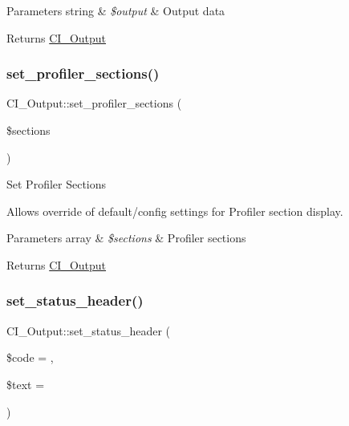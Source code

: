 \begin{DoxyParams}[1]{Parameters}
string & {\em \$output} & Output data \\
\hline
\end{DoxyParams}
\begin{DoxyReturn}{Returns}
\mbox{\hyperlink{class_c_i___output}{C\+I\+\_\+\+Output}} 
\end{DoxyReturn}
\mbox{\label{class_c_i___output_a5eec9b34053c10c787e340e74d66fc98}} 
\subsubsection{\texorpdfstring{set\+\_\+profiler\+\_\+sections()}{set\_profiler\_sections()}}
{\footnotesize\ttfamily C\+I\+\_\+\+Output\+::set\+\_\+profiler\+\_\+sections (\begin{DoxyParamCaption}\item[{}]{\$sections }\end{DoxyParamCaption})}

Set Profiler Sections

Allows override of default/config settings for Profiler section display.


\begin{DoxyParams}[1]{Parameters}
array & {\em \$sections} & Profiler sections \\
\hline
\end{DoxyParams}
\begin{DoxyReturn}{Returns}
\mbox{\hyperlink{class_c_i___output}{C\+I\+\_\+\+Output}} 
\end{DoxyReturn}
\mbox{\label{class_c_i___output_a1a4cee03a9a0d191e26e5e8898662d69}} 
\subsubsection{\texorpdfstring{set\+\_\+status\+\_\+header()}{set\_status\_header()}}
{\footnotesize\ttfamily C\+I\+\_\+\+Output\+::set\+\_\+status\+\_\+header (\begin{DoxyParamCaption}\item[{}]{\$code = {},  }\item[{}]{\$text = {\ttfamily \textquotesingle{}\textquotesingle{}} }\end{DoxyParamCaption})}

